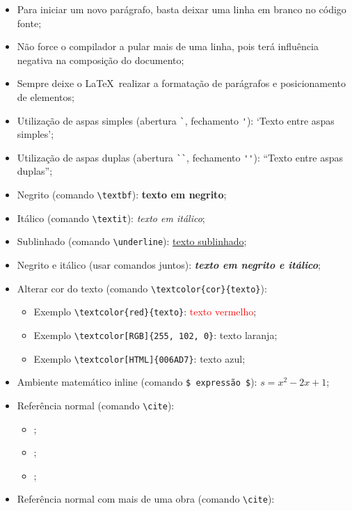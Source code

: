 \documentclass[
	article,
	11pt,
	oneside,
	a4paper,
	chapter=TITLE,
	section=TITLE,
	english,
	brazil,
	sumario=tradicional
]{abntex2}
\begin{document}
     \begin{itemize}
     	\item Para iniciar um novo parágrafo, basta deixar uma linha em branco no código fonte;
     	\item Não force o compilador a pular mais de uma linha, pois terá influência negativa na composição do documento;
     	\item Sempre deixe o \LaTeX\ realizar a formatação de parágrafos e posicionamento de elementos;
     	\item Utilização de aspas simples (abertura \verb|`|, fechamento \verb|'|): `Texto entre aspas simples';
     	\item Utilização de aspas duplas (abertura \verb|``|, fechamento \verb|''|): ``Texto entre aspas duplas'';
     	\item Negrito (comando \verb|\textbf|): \textbf{texto em negrito};
     	\item Itálico (comando \verb|\textit|): \textit{texto em itálico};
     	\item Sublinhado (comando \verb|\underline|): \underline{texto sublinhado};
     	\item Negrito e itálico (usar comandos juntos): \textbf{\textit{texto em negrito e itálico}};
     	\item Alterar cor do texto (comando \verb|\textcolor{cor}{texto}|):
     	\begin{itemize}
     		\item Exemplo \verb|\textcolor{red}{texto}|: \textcolor{red}{texto vermelho};
     		\item Exemplo \verb|\textcolor[RGB]{255, 102, 0}|: \textcolor[RGB]{255, 102, 0}{texto laranja};
     		\item Exemplo \verb|\textcolor[HTML]{006AD7}|: \textcolor[HTML]{006AD7}{texto azul};
     	\end{itemize}
     	\item Ambiente matemático inline (comando \verb|$ expressão $|): $s = x^2-2x +1$;
     	\item Referência normal (comando \verb|\cite|):
     	\begin{itemize}
     		\item \cite{Agaisse1995};
     		\item \cite{Abedi2014};
     		\item \cite{BtNomenclature2016};
     	\end{itemize}
     	\item Referência normal com mais de uma obra (comando \verb|\cite|):

\end{itemize}
\end{document}
